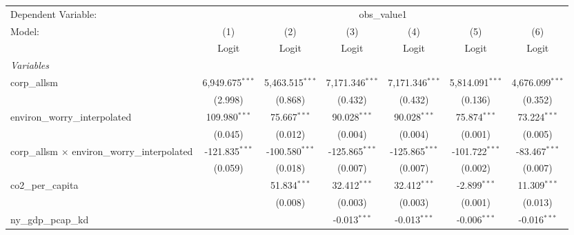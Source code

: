 
\begingroup
\centering
\begin{tabular}{lcccccc}
   \toprule
   Dependent Variable: & \multicolumn{6}{c}{obs\_value1}\\
   Model:                                                & (1)               & (2)               & (3)               & (4)               & (5)               & (6)\\  
                                                         &  Logit            & Logit             & Logit             & Logit             & Logit             & Logit\\  
   \midrule
   \emph{Variables}\\
   corp\_allsm                                           & 6,949.675$^{***}$ & 5,463.515$^{***}$ & 7,171.346$^{***}$ & 7,171.346$^{***}$ & 5,814.091$^{***}$ & 4,676.099$^{***}$\\   
                                                         & (2.998)           & (0.868)           & (0.432)           & (0.432)           & (0.136)           & (0.352)\\   
   environ\_worry\_interpolated                          & 109.980$^{***}$   & 75.667$^{***}$    & 90.028$^{***}$    & 90.028$^{***}$    & 75.874$^{***}$    & 73.224$^{***}$\\   
                                                         & (0.045)           & (0.012)           & (0.004)           & (0.004)           & (0.001)           & (0.005)\\   
   corp\_allsm $\times$ environ\_worry\_interpolated     & -121.835$^{***}$  & -100.580$^{***}$  & -125.865$^{***}$  & -125.865$^{***}$  & -101.722$^{***}$  & -83.467$^{***}$\\   
                                                         & (0.059)           & (0.018)           & (0.007)           & (0.007)           & (0.002)           & (0.007)\\   
   co2\_per\_capita                                      &                   & 51.834$^{***}$    & 32.412$^{***}$    & 32.412$^{***}$    & -2.899$^{***}$    & 11.309$^{***}$\\   
                                                         &                   & (0.008)           & (0.003)           & (0.003)           & (0.001)           & (0.013)\\   
   ny\_gdp\_pcap\_kd                                     &                   &                   & -0.013$^{***}$    & -0.013$^{***}$    & -0.006$^{***}$    & -0.016$^{***}$\\   

\end{tabular}
